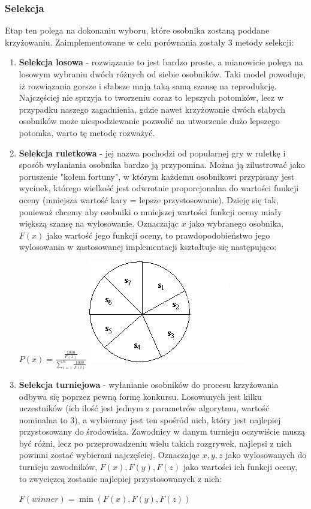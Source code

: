 \subsubsection{Selekcja}
Etap ten polega na dokonaniu wyboru, które osobnika zostaną poddane krzyżowaniu. Zaimplementowane w celu porównania zostały 3 metody selekcji:
\begin{enumerate}
\item \textbf{Selekcja losowa} - rozwiązanie to jest bardzo proste, a mianowicie polega na losowym wybraniu dwóch różnych od siebie osobników. Taki model powoduje, iż rozwiązania gorsze i słabsze mają taką samą szansę na reprodukcję. Najczęściej nie sprzyja to tworzeniu coraz to lepszych potomków, lecz w przypadku naszego zagadnienia, gdzie nawet krzyżowanie dwóch słabych osobników może niespodziewanie pozwolić na utworzenie dużo lepszego potomka, warto tę metodę rozważyć.
\item \textbf{Selekcja ruletkowa} - jej nazwa pochodzi od popularnej gry w ruletkę i sposób wyłaniania osobnika bardzo ją przypomina. Można ją zilustrować jako poruszenie "kołem fortuny", w którym każdemu osobnikowi przypisany jest wycinek, którego wielkość jest odwrotnie proporcjonalna do wartości funkcji oceny (mniejsza wartość kary = lepsze przystosowanie). Dzieję się tak, ponieważ chcemy aby osobniki o mniejszej wartości funkcji oceny miały większą szansę na wylosowanie. Oznaczając $x$ jako wybranego osobnika, $F(x)$ jako wartość jego funkcji oceny, to prawdopodobieństwo jego wylosowania w zastosowanej implementacji kształtuje się następująco:
\begin{center}
$P(x) = \frac{\frac{1000}{F(x)}}{\sum_{i=1}^{n}\frac{1000}{F(i)}}$
\includegraphics[scale=0.5]{img/rouletteSelect.png}
\end{center}
\item \textbf{Selekcja turniejowa} - wyłanianie osobników do procesu krzyżowania odbywa się poprzez pewną formę konkursu. Losowanych jest kilku uczestników (ich ilość jest jednym z parametrów algorytmu, wartość nominalna to 3), a wybierany jest ten spośród nich, który jest najlepiej przystosowany do środowiska. Zawodnicy w danym turnieju oczywiście muszą być różni, lecz po przeprowadzeniu wielu takich rozgrywek, najlepsi z nich powinni zostać wybierani najczęściej. Oznaczając $x, y, z$ jako wylosowanych do turnieju zawodników, $F(x), F(y), F(z)$ jako wartości ich funkcji oceny, to zwycięzcą zostanie najlepiej przystosowanych z nich:
\begin{center}
$F(winner) = \min(F(x), F(y), F(z))$
\end{center}
\end{enumerate}
